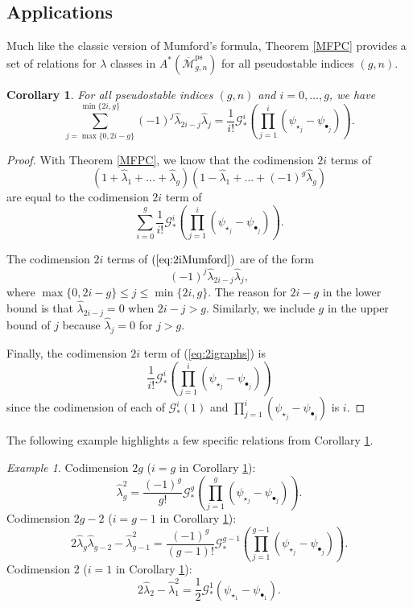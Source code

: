 \documentclass[leqno,12pt]{amsart}
\newtheorem{corollary}[theorem]{Corollary}
\theoremstyle{remark}
\newtheorem{example}[theorem]{Example}
\numberwithin{equation}{section}
\DeclareMathOperator{\ps}{ps}
\begin{document}
\subsection{Applications}

Much like the classic version of Mumford's formula, Theorem \ref{MFPC} provides a set of relations for $\lambda$ classes in $A^*(\overline{\mathcal{M}}^{\ps}_{g, n})$ for all pseudostable indices $(g, n)$. %

\begin{corollary}\label{Relations}
    For all pseudostable indices $(g, n)$ and $i = 0, \dots, g$, we have
    $$
    \sum_{j = \max\{0, 2i-g\}}^{\min\{2i, g\}}(-1)^j\hat{\lambda}_{2i-j}\hat{\lambda}_j = \frac{1}{i!}\mathcal{G}_*^i\left(\prod_{j=1}^i(\psi_{\star_j}-\psi_{\bullet_j})\right).
    $$
\end{corollary}
\begin{proof}
With Theorem \ref{MFPC}, we know that the codimension $2i$ terms of 
\begin{equation}\label{eq:2iMumford}
    (1 + \hat{\lambda}_1 + \dots + \hat{\lambda}_g)(1 - \hat{\lambda}_1 + \dots + (-1)^g\hat{\lambda}_g)
\end{equation}
are equal to the codimension $2i$ term of 
\begin{equation}\label{eq:2igraphs}
    \sum_{i=0}^g\frac{1}{i!}\mathcal{G}_*^i\left(\prod_{j=1}^i(\psi_{\star_j}-\psi_{\bullet_j})\right).
\end{equation}

The codimension $2i$ terms of $(\ref{eq:2iMumford})$ are of the form
$$
(-1)^j\hat{\lambda}_{2i-j}\hat{\lambda}_j,
$$
where $\max\{0, 2i - g\} \leq j \leq \min\{2i, g\}$. The reason for $2i - g$ in the lower bound is that $\hat{\lambda}_{2i-j} = 0$ when $2i - j > g$. Similarly, we include $g$ in the upper bound of $j$ because $\hat{\lambda}_j = 0$ for $j > g$.

Finally, the codimension $2i$ term of (\ref{eq:2igraphs}) is 
$$
\frac{1}{i!}\mathcal{G}_*^i\left(\prod_{j=1}^i(\psi_{\star_j}-\psi_{\bullet_j})\right)
$$
since the codimension of each of $\mathcal{G}_*^i(1)$ and $\prod_{j=1}^i(\psi_{\star_j}-\psi_{\bullet_j})$ is $i$.
\end{proof}

The following example highlights a few specific relations from Corollary \ref{Relations}.

\begin{example}
Codimension $2g$ ($i = g$ in Corollary \ref{Relations}):
$$
\hat{\lambda}_g^2 = \frac{(-1)^g}{g!}\mathcal{G}_*^g\left(\prod_{j=1}^g(\psi_{\star_j} - \psi_{\bullet_j})\right).
$$
Codimension $2g-2$ ($i = g-1$ in Corollary \ref{Relations}):
$$
2\hat{\lambda}_g\hat{\lambda}_{g-2} - \hat{\lambda}_{g-1}^2 = \frac{(-1)^g}{(g-1)!}\mathcal{G}_*^{g-1}\left(\prod_{j=1}^{g-1}(\psi_{\star_j} - \psi_{\bullet_j})\right).
$$
Codimension $2$ ($i = 1$ in Corollary \ref{Relations}):
$$
2\hat{\lambda}_2 - \hat{\lambda}_1^2 = \frac{1}{2}\mathcal{G}_*^1\left(\psi_{\star_1} - \psi_{\bullet_1}\right).
$$
\end{example}
\end{document}
